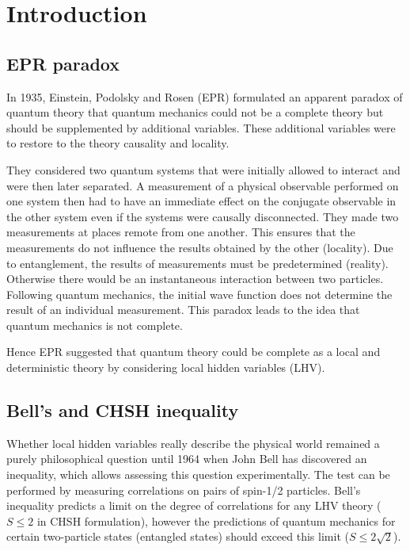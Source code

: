 \documentclass[12pt,a4paper]{article}
\begin{document}


\section{Introduction}
\subsection{EPR paradox}
In 1935, Einstein, Podolsky and Rosen (EPR) formulated an apparent paradox of quantum theory that quantum mechanics could not be a complete theory but should be supplemented by additional variables. These additional variables were to restore to the theory causality and locality. 

They considered two quantum systems that were initially allowed to interact and were then later separated. A measurement of a physical observable performed on one system then had to have an immediate effect on the conjugate observable in the other system even if the systems were causally disconnected. They made two measurements at places remote from one another. This ensures that the measurements do not influence the results obtained by the other (locality). Due to entanglement, the results of measurements must be predetermined (reality). Otherwise there would be an instantaneous interaction between two particles. Following quantum mechanics, the initial wave function does not determine the result of an individual measurement. This paradox leads to the idea that quantum mechanics is not complete.

Hence EPR suggested that quantum theory could be complete as a local and deterministic theory by considering local hidden variables (LHV).

\subsection{Bell's and CHSH inequality}
Whether local hidden variables really describe the physical world remained a purely philosophical question until 1964 when John Bell has discovered an inequality, which allows assessing this question experimentally. The test can be performed by measuring correlations on pairs of spin-1/2 particles. Bell's inequality predicts a limit on the degree of correlations for any LHV theory ($S\leq 2$ in CHSH formulation), however the predictions of quantum mechanics for certain two-particle states (entangled states) should exceed this limit ($S\leq 2\sqrt{2}$).
\end{document}
